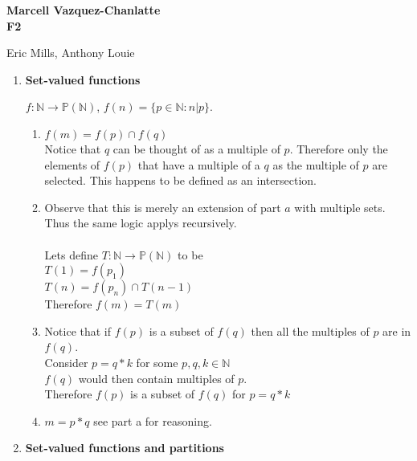 \documentclass[12pt]{article}
\begin{document}
\begin{center}
  {\LARGE
  \textbf{Marcell Vazquez-Chanlatte}
  \\
  \textbf{F2}
  \\[1ex]}
\end{center}

\begin{center}
  Eric Mills, Anthony Louie
\end{center}

\begin{enumerate}

\item
\textbf{Set-valued functions}

 $f:\mathbb{N} \rightarrow \mathbb{P}(\mathbb{N})$, $f(n) = \{p \in \mathbb{N} : n | p\}$.

\begin{enumerate}
\item $f(m)= f(p) \cap f(q)$\\
  Notice that $q$ can be thought of as a multiple of $p$. Therefore only
  the elements of $f(p)$ that have a multiple of a $q$ as the multiple
  of $p$ are selected. This happens to be defined as an intersection.

\item Observe that this is merely an extension of part $a$ with
  multiple sets. Thus the same logic applys recursively.\\
\\
Lets define  $T:\mathbb{N} \rightarrow \mathbb{P}(\mathbb{N})$ to be\\
$T(1) = f(p_1)$\\
$T(n) = f(p_n) \cap T(n-1)$\\

Therefore $f(m) = T(m)$
\item Notice that if $f(p)$ is a subset of $f(q)$ then all the
  multiples of $p$ are in $f(q)$.\\
  Consider $p=q*k$ for some $p,q,k\in \mathbb{N}$\\
  $f(q)$ would then contain multiples of $p$.\\
  Therefore $f(p)$ is a subset of $f(q)$ for $p = q*k$
\item $m=p*q$ see part a for reasoning.
\end{enumerate}


\newpage
\item
\textbf{Set-valued functions and partitions}


\end{enumerate}
\end{document}
